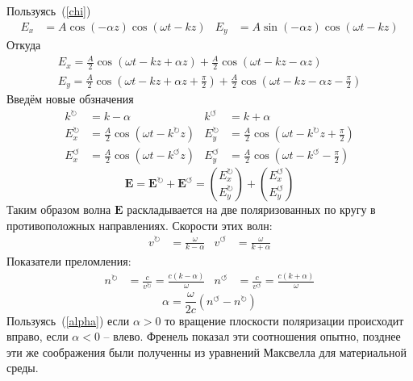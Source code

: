 	Пользуясь~(\ref{chi})
	\begin{align*}
	E_{x} &= A\cos(-\alpha z)\cos(\omega t - kz) & E_{y} &= A\sin(-\alpha z)\cos(\omega t - kz)  
	\end{align*}
	Откуда
	\begin{gather}
	E_{x} = \frac{A}{2}\cos(\omega t - kz + \alpha z) + \frac{A}{2}\cos(\omega t - kz - \alpha z)\\
	E_{y} = \frac{A}{2}\cos\left(\omega t - kz + \alpha z + \frac{\pi}{2}\right) + \frac{A}{2}\cos\left(\omega t - kz - \alpha z - \frac{\pi}{2}\right)
	\end{gather}
	Введём новые обзначения
	\begin{align*}
	k^{\circlearrowright} &= k - \alpha & k^{\circlearrowleft} &= k + \alpha\\
	E_{x}^{\circlearrowright} &= \frac{A}{2}\cos(\omega t - k^{\circlearrowright} z) & E_{y}^{\circlearrowright} &= \frac{A}{2}\cos\left( \omega t - k^{\circlearrowright} z + \frac{\pi}{2}\right) \\
	E_{x}^{\circlearrowleft} &= \frac{A}{2}\cos(\omega t - k^{\circlearrowleft} z) & E_{y}^{\circlearrowleft} &= \frac{A}{2}\cos\left( \omega t - k^{\circlearrowleft}  - \frac{\pi}{2}\right)
	\end{align*}
	\begin{equation*}
	\mathbf{E} = \mathbf{E}^{\circlearrowright} + \mathbf{E}^{\circlearrowleft} = \binom{E_{x}^{\circlearrowright}}{E_{y}^{\circlearrowright}} + \binom{E_{x}^{\circlearrowleft}}{E_{y}^{\circlearrowleft}} 
	\end{equation*}
	Таким образом волна $\mathbf{E}$ раскладывается на две поляризованных по кругу в противоположных направлениях.
	Скорости этих волн:
	\begin{align*}
	v^{\circlearrowright} &= \frac{\omega}{k - \alpha} & v^{\circlearrowleft} &= \frac{\omega}{k + \alpha}
	\end{align*}
	Показатели преломления:
	\begin{align*}
	n^{\circlearrowright} &= \frac{c}{v^{\circlearrowright}} = \frac{c(k - \alpha)}{\omega} & n^{\circlearrowleft} &= \frac{c}{v^{\circlearrowleft}} = \frac{c(k + \alpha)}{\omega}
	\end{align*}
	\begin{equation}
	\label{alpha}
	\alpha = \frac{\omega}{2c}\left(n^{\circlearrowleft} - 	n^{\circlearrowright}  \right) 
	\end{equation}
	Пользуясь~(\ref{alpha}) если $\alpha > 0 $ то вращение плоскости поляризации происходит вправо, если  $\alpha < 0 $ -- влево.
	Френель показал эти соотношения опытно, позднее эти же соображения были полученны из уравнений Максвелла для материальной среды. 
